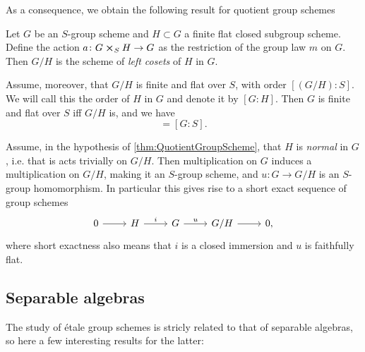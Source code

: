 \documentclass[../Main]{subfiles}
\begin{document}
As a consequence, we obtain the following result for quotient group schemes
\begin{prop}\label{thm:QuotientGroupScheme}
	Let $G$ be an $S$-group scheme and $H \subset G$ a finite flat closed
	subgroup scheme.
	Define the action $a\colon G \cross_{ S } H \to G$ as the restriction of the
	group law $m$ on $G$.
	Then $G/H$ is the scheme of {\em left cosets} of $H$ in $G$.

	Assume, moreover, that $G/H$ is finite and flat over $S$,
	with order $[(G/H):S]$. We will call this the order of $H$ in $G$
	and denote it by $[G:H]$.
	Then $G$ is finite and flat over $S$ iff $G/H$ is, and we have
	\begin{equation*}
		[G:H][H:S] = [G:S]
	.\end{equation*} 
\end{prop}

\begin{rem}
	Assume, in the hypothesis of \cref{thm:QuotientGroupScheme}, that $H$ is
	{\em normal} in $G$, i.e. that is acts trivially on $G/H$.
	Then multiplication on $G$ induces a multiplication on $G/H$, making it
	an $S$-group scheme, and $u\colon G \to G/H$
	is an $S$-group homomorphism.
	In particular this gives rise to a short exact sequence of group schemes
	\begin{equation*}
	\begin{tikzcd}
		0 \arrow[r, "", rightarrow] &
		H \arrow[r, "i", rightarrow] &
		G \arrow[r, "u", rightarrow] &
		G/H \arrow[r, "", rightarrow] &
		0
	,\end{tikzcd}
	\end{equation*}
	where short exactness also means that $i$ is a closed immersion
	and $u$ is faithfully flat.
\end{rem}




\subsection{Separable algebras}
The study of {\'e}tale group schemes is stricly related to that of
separable algebras, so here a few interesting results for the latter:
\end{document}
